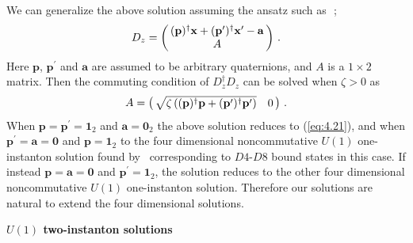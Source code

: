 \documentclass[a4paper,12pt]{article}
\begin{document}
We can generalize the above solution assuming the ansatz such as~\cite{pt}\,;
\begin{equation}
D_z =
\left( \begin{array}{@{\,}c@{\,}}
 (\mathbf{p})^{\dagger}\mathbf{x} 
 +(\mathbf{p}^{\prime})^{\dagger}
\mathbf{x}^{\prime} -\mathbf{a} \\
 A 
  \end{array}  \right)\,.
\end{equation}
Here $\mathbf{p}$, $\mathbf{p}^{\prime}$ and $\mathbf{a}$ are assumed 
to be arbitrary quaternions, and $A$ is a $1\times 2$ matrix.
Then the commuting condition of $D^{\dagger}_zD_z$  
can be solved when $\zeta >0$ as
\begin{equation}
A=\left( \begin{array}{@{\,}cc@{\,}}
\sqrt{\zeta \left( (\mathbf{p})^{\dagger}\mathbf{p} 
+(\mathbf{p}^{\prime})^{\dagger}\mathbf{p}^{\prime}\right) } & 0
  \end{array}  \right)\,.
\end{equation}
When $\mathbf{p}=\mathbf{p}^{\prime}=\mathbf{1}_{2}$ and 
$\mathbf{a}=\mathbf{0}_2$ the above solution 
reduces to (\ref{eq:4.21}), 
and when $\mathbf{p}^{\prime}=\mathbf{a}=\mathbf{0}$ 
and $\mathbf{p}=\mathbf{1}_{2}$ to the four dimensional noncommutative 
$U(1)$ one-instanton solution found by~\cite{furuuchi, furuuchi2} 
corresponding to $D4$-$D8$ bound states in this case.
If instead $\mathbf{p}=\mathbf{a}=\mathbf{0}$ 
and $\mathbf{p}^{\prime}=\mathbf{1}_{2}$, the solution reduces 
to the other four dimensional noncommutative 
$U(1)$ one-instanton solution.
Therefore our solutions are natural to extend the four dimensional solutions.



\begin{flushleft}
\textbf{$U(1)$ two-instanton solutions}
\end{flushleft}
\end{document}

